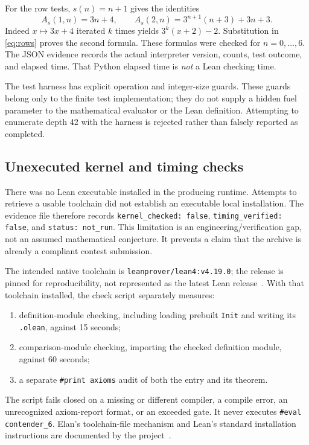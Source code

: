 \documentclass[11pt]{article}
\theoremstyle{definition}
\begin{document}
For the row tests, $s(n)=n+1$ gives the identities
\[
 A_s(1,n)=3n+4,\qquad
 A_s(2,n)=3^{n+1}(n+3)+3n+3.
\]
Indeed $x\mapsto3x+4$ iterated $k$ times yields $3^k(x+2)-2$. Substitution in
\eqref{eq:rows} proves the second formula. These formulas were checked for
$n=0,\ldots,6$. The JSON evidence records the actual interpreter version,
counts, test outcome, and elapsed time. That Python elapsed time is \emph{not}
a Lean checking time.

The test harness has explicit operation and integer-size guards. These guards
belong only to the finite test implementation; they do not supply a hidden fuel
parameter to the mathematical evaluator or the Lean definition. Attempting to
enumerate depth 42 with the harness is rejected rather than falsely reported as
completed.

\subsection{Unexecuted kernel and timing checks}
There was no Lean executable installed in the producing runtime. Attempts to
retrieve a usable toolchain did not establish an executable local installation.
The evidence file therefore records \texttt{kernel\_checked: false},
\texttt{timing\_verified: false}, and \texttt{status: not\_run}. This limitation
is an engineering/verification gap, not an assumed mathematical conjecture.
It prevents a claim that the archive is already a compliant contest submission.

The intended native toolchain is \texttt{leanprover/lean4:v4.19.0}; the release is
pinned for reproducibility, not represented as the latest Lean release~\cite{leanrelease}.
With that toolchain installed, the check script separately measures:
\begin{enumerate}[nosep,leftmargin=2em]
 \item definition-module checking, including loading prebuilt \texttt{Init}
       and writing its \texttt{.olean}, against 15 seconds;
 \item comparison-module checking, importing the checked definition module,
       against 60 seconds;
 \item a separate \texttt{\#print axioms} audit of both the entry and its theorem.
\end{enumerate}
The script fails closed on a missing or different compiler, a compile error,
an unrecognized axiom-report format, or an exceeded gate. It never executes
\texttt{\#eval contender\_6}. Elan's toolchain-file mechanism and Lean's standard
installation instructions are documented by the project~\cite{elan,leaninstall}.
\end{document}
